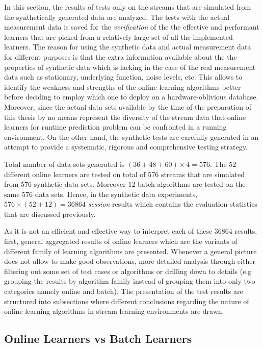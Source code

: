 In this section, the results of tests only on the streams that are simulated from the synthetically generated data are analyzed. The tests with the actual measurement data is saved for the \textit{verification} of the the effective and performant learners that are picked from a relatively large set of all the implemented learners. The reason for using the synthetic data and actual measurement data for different purposes is that the extra information available about the the properties of synthetic data which is lacking in the case of the real measurement data such as stationary, underlying function, noise levels, etc. This allows to identify the weakness and strengths of the online learning algorithms better before deciding to employ which one to deploy on a hardware-oblivious database. Moreover, since the actual data sets available by the time of the preparation of this thesis by no means represent the diversity of the stream data that online learners for runtime prediction problem can be confronted in a running environment. On the other hand, the synthetic tests are carefully generated in an attempt to provide a systematic, rigorous and comprehensive testing strategy.

Total number of data sets generated is $(36+48+60)\times 4 = 576$. The $52$ different online learners are tested on total of 576 streams that are simulated from 576 synthetic data sets. Moreover $12$ batch algorithms are tested on the same 576 data sets. Hence, in the synthetic data experiments, $576\times (52+12)=36864$ \textit{session} results which contains the evaluation statistics that are discussed previously. 

As it is not an efficient and effective way to interpret each of these $36864$ results, first, general aggregated results of online learners which are the variants of different family of learning algorithms are presented. Whenever a general picture does not allow to make good observations, more detailed analysis through either filtering out some set of test cases or algorithms or drilling down to details (e.g grouping the results by algorithm family instead of grouping them into only two categories namely online and batch). The presentation of the test results are structured into subsections where different conclusions regarding the nature of online learning algorithms in stream learning environments are drawn.

\subsection{Online Learners vs Batch Learners}

